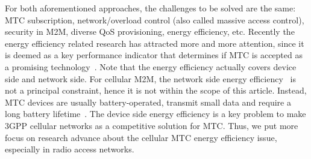For both aforementioned approaches, the challenges to be solved are the same: MTC subscription, network/overload control (also called massive access control), security in M2M, diverse QoS provisioning, energy efficiency, etc. Recently the energy efficiency related research has attracted more and more attention, since it is deemed as a key performance indicator that determines if MTC is accepted as a promising technology~\cite{lu11GRS}\cite{Costa14}. Note that the energy efficiency actually covers device side and network side. For cellular M2M, the network side energy efficiency~\cite{suarez2012overview}\cite{wang2014voting} is not a principal constraint, hence it is not within the scope of this article. Instead, MTC devices are usually battery-operated, transmit small data and require a long battery lifetime~\cite{YuanHo12}. The device side energy efficiency is a key problem to make 3GPP cellular networks as a competitive solution for MTC. Thus, we put more focus on research advance about the cellular MTC energy efficiency issue, especially in radio access networks.

